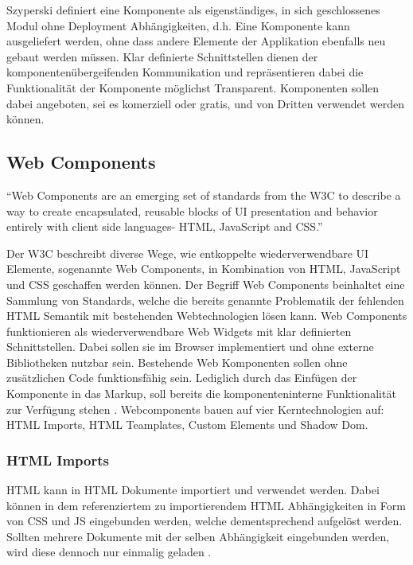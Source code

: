 Szyperski definiert eine Komponente als eigenständiges, in sich geschlossenes Modul ohne Deployment
Abhängigkeiten, d.h. Eine Komponente kann ausgeliefert werden, ohne dass andere Elemente der Applikation ebenfalls neu gebaut werden müssen.
Klar definierte Schnittstellen dienen der komponentenübergeifenden Kommunikation und repräsentieren
dabei die Funktionalität der Komponente möglichst Transparent.
Komponenten sollen dabei angeboten, sei es komerziell oder gratis,
und von Dritten verwendet werden können.


\subsection{Web Components}

``Web Components are an emerging set of standards from the W3C to describe a way to create encapsulated,
reusable blocks of UI presentation and behavior entirely with client side languages- HTML, JavaScript and CSS.''
\cite[42]{Web-Component-Architecture}
\vspace{1cm}

Der W3C beschreibt diverse Wege, wie entkoppelte wiederverwendbare UI Elemente, sogenannte Web Components,
in Kombination von \ac{HTML}, JavaScript und \ac{CSS} geschaffen werden können.
Der Begriff Web Components beinhaltet eine Sammlung von Standards,
welche die bereits genannte Problematik der fehlenden HTML Semantik mit bestehenden Webtechnologien lösen kann.
Web Components funktionieren als wiederverwendbare Web Widgets mit klar definierten Schnittstellen.
Dabei sollen sie im Browser implementiert und ohne externe Bibliotheken nutzbar sein.
Bestehende Web Komponenten sollen ohne zusätzlichen Code funktionsfähig sein. Lediglich durch das Einfügen der Komponente
in das Markup, soll bereits die komponenteninterne Funktionalität zur Verfügung stehen
\cite[42]{Web-Component-Architecture}.
Webcomponents bauen auf vier Kerntechnologien auf: HTML Imports, HTML Teamplates, Custom Elements und Shadow Dom.

\subsubsection{HTML Imports}
HTML kann in HTML Dokumente importiert und verwendet werden.
Dabei können in dem referenziertem zu importierendem HTML Abhängigkeiten in Form von CSS und JS eingebunden werden,
welche dementsprechend aufgelöst werden.
Sollten mehrere Dokumente mit der selben Abhängigkeit eingebunden werden, wird diese dennoch nur einmalig geladen
\cite{HTMLI44:online}.

